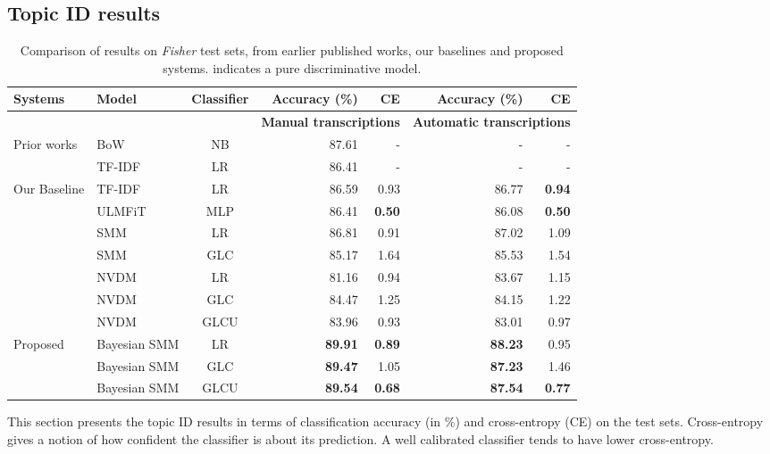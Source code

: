 \documentclass[journal]{IEEEtran}
\begin{document}
\subsection{Topic ID results}
\label{ssec:topic_id}
\begin{table*}[!t]
 \begin{center}
 \caption{\label{tab:res}Comparison of results on \textit{Fisher} test sets, 
	from earlier published works, our baselines and proposed systems.  
	indicates a pure discriminative model.}
 \begin{tabular}{llcrrrr} \toprule
  \bf{Systems} & \bf{Model} & \bf{Classifier} & \bf{Accuracy (\%)} & \bf{CE} & 
  \bf{Accuracy (\%)} & \bf{CE} \\ \midrule
 & & & \multicolumn{2}{c}{\bf{Manual transcriptions}} & 
 \multicolumn{2}{c}{\bf{Automatic transcriptions}}\\ \midrule
 \multirow{2}{*}{Prior works} & BoW~\cite{Hazen:2007:ASRU} & NB & 87.61 &-&-&-\\
  &TF-IDF ~\cite{May:2015:mivec} & LR   & 86.41       &  - & - & -     \\
	\midrule
  \multirow{7}{*}{Our Baseline} & TF-IDF & LR & 86.59 & 0.93 & 86.77 & 
  \textbf{0.94} \\
 &ULMFiT    & MLP  & 86.41 & \textbf{0.50} & 86.08 & \textbf{0.50} 
		\\ \cmidrule{2-7}
 & SMM      & LR   & 86.81 & 0.91 & 87.02 & 1.09 \\
 & SMM      & GLC  & 85.17 & 1.64 & 85.53 & 1.54 \\ \cmidrule{2-7}
 &NVDM                       & LR    & 81.16 & 0.94 & 83.67 & 1.15 \\
 &NVDM                       & GLC   & 84.47 & 1.25 & 84.15 & 1.22 \\
 &NVDM                       & GLCU  & 83.96 & 0.93 & 83.01 & 0.97 \\ \midrule
 \multirow{3}{*}{Proposed} &Bayesian SMM& LR& \textbf{89.91} &  \textbf{0.89} 
 & \textbf{88.23} & 0.95\\
 &	Bayesian SMM  & GLC & \textbf{89.47} & 1.05 & \textbf{87.23} & 1.46 \\
 &	Bayesian SMM & GLCU   & \textbf{89.54} & \textbf{0.68} & 		
 \textbf{87.54} & \textbf{0.77} \\
 \bottomrule
 \end{tabular}
 \end{center}
\end{table*}
This section presents the topic ID results in terms of classification 
accuracy (in \%) and cross-entropy (CE) on the test sets. Cross-entropy gives
a notion of how confident the classifier is about its prediction. A well 
calibrated classifier tends to have lower cross-entropy.
\end{document}
